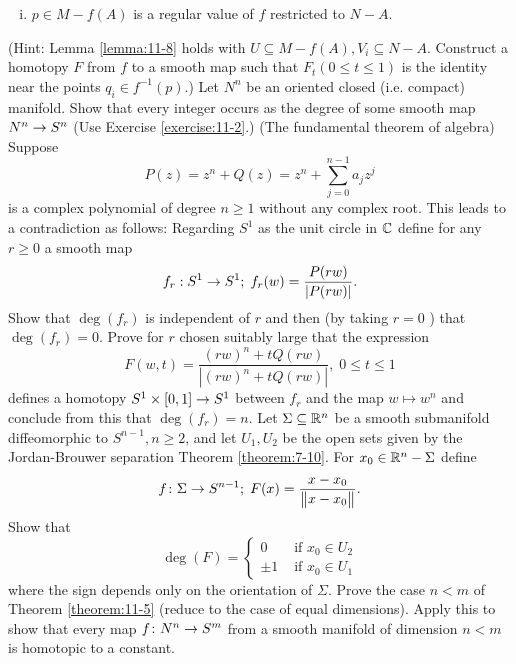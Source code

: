 \begin{enumerate}[\theexercise.1]
\begin{enumerate}[(i)]
    \item $p \in  M-f( A)$ is a regular value of $f$ restricted to $N- A$.
  \end{enumerate}\par(Hint: Lemma \ref{lemma:11-8} holds with $U \subseteq  M- f( A),{V}_{i} \subseteq  N- A$. Construct a homotopy $F$ from $f$ to a smooth map such that ${F}_{t}( {0 \leq  t \leq  1})$ is the identity near the points ${q}_{i} \in  {f}^{-1}( p)$.)
  \NewItem Let ${N}^{n}$ be an oriented closed (i.e. compact) manifold. Show that every integer occurs as the degree of some smooth map ${N}^{n} \rightarrow  {S}^{n}$ (Use Exercise \ref{exercise:11-2}.)
  \NewItem (The fundamental theorem of algebra) Suppose
    \[
      P( z)  = {z}^{n} + Q( z)  = {z}^{n} + \sum_{{j = 0}}^{{n- 1}}{a}_{j}{z}^{j}
    \]
    is a complex polynomial of degree $n \geq  1$ without any complex root. This leads to a contradiction as follows: Regarding ${S}^{1}$ as the unit circle in $\mathbb{C}$ define for any $r \geq  0$ a smooth map
    \[
      {f}_{r} : {S}^{1} \rightarrow  {S}^{1};\;{f}_{r}( w)  = \frac{P( {rw}) }{\left| P( rw) \right| }.
    \]
    Show that $\deg ( {f}_{r})$ is independent of $r$ and then (by taking $r = 0$ ) that $\deg ( {f}_{r})  = 0$. Prove for $r$ chosen suitably large that the expression
    \[
      F( {w,t})  = \frac{{( rw) }^{n} + {tQ}( {rw}) }{\left| {( rw) }^{n} + tQ( rw) \right| },\;0 \leq  t \leq  1
    \]
    defines a homotopy ${S}^{1} \times  [  {0,1}]   \rightarrow  {S}^{1}$ between ${f}_{r}$ and the map $w \mapsto  {w}^{n}$ and conclude from this that $\deg ( {f}_{r})  = n$.
  \NewItem Let $\Sigma \subseteq  {\ensuremath{\mathbb{R}}}^{n}$ be a smooth submanifold diffeomorphic to ${S}^{n- 1},n \geq  2$, and let ${U}_{1},{U}_{2}$ be the open sets given by the Jordan-Brouwer separation Theorem \ref{theorem:7-10}. For ${x}_{0} \in  {\ensuremath{\mathbb{R}}}^{n}- \Sigma$ define
    \[
      f\colon \Sigma  \rightarrow  {S}^{n- 1};\;F( x)  = \frac{x- {x}_{0}}{\begin{Vmatrix}x- {x}_{0}\end{Vmatrix}}.
    \]
    Show that
    \[
      \deg ( F)  = \left\{  \begin{array}{ll} 0 & \text{ if }{x}_{0} \in  {U}_{2} \\   \pm  1 & \text{ if }{x}_{0} \in  {U}_{1} \end{array}\right.
    \]
    where the sign depends only on the orientation of $\Sigma$.
  \NewItem Prove the case $n < m$ of Theorem \ref{theorem:11-5} (reduce to the case of equal dimensions).
    Apply this to show that every map $f\colon {N}^{n} \rightarrow  {S}^{m}$ from a smooth manifold of dimension $n < m$ is homotopic to a constant.

\end{enumerate}
